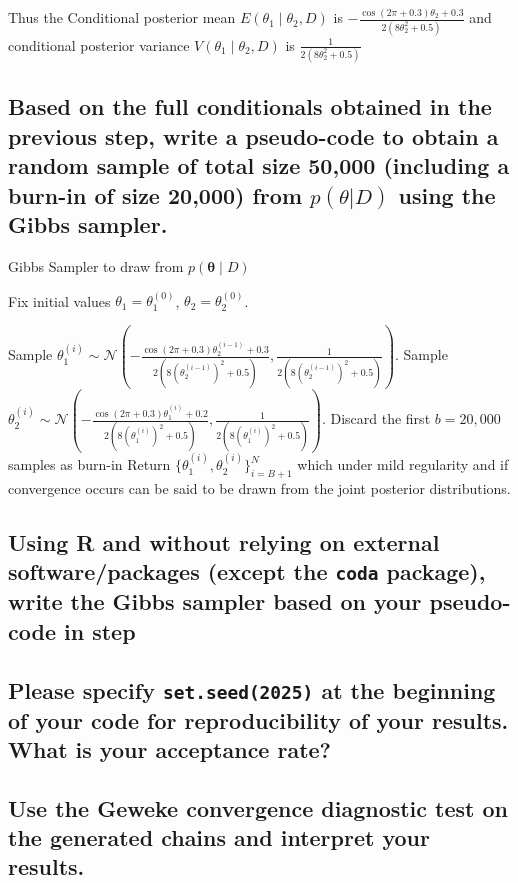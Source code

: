 \documentclass[12pt]{article}
\begin{document}
Thus the  Conditional posterior mean \(E(\theta_1 \mid \theta_2, D)\)  is $-\frac{\cos(2\pi + 0.3)\theta_2 + 0.3}{2(8\theta_2^2 + 0.5)}$ and  conditional posterior variance \(V(\theta_1 \mid \theta_2, D)\) is $\frac{1}{2(8\theta_2^2 + 0.5)}$

\subsection{ Based on the full conditionals obtained in the previous step, write a pseudo-code to obtain a random sample of total size 50,000 (including a burn-in of size 20,000) from $p(\theta | D)$ using the Gibbs sampler.} 
\begin{algorithm}
Gibbs Sampler to draw from \( p(\boldsymbol{\theta} \mid D) \)
\begin{algorithmic}[1]

\State Fix initial values \( \theta_1 = \theta_1^{(0)} \), \( \theta_2 = \theta_2^{(0)} \).

    \State Sample \( \theta_1^{(i)} \sim \mathcal{N}\left(-\frac{\cos(2\pi + 0.3)\theta_2^{(i-1)} + 0.3}{2(8(\theta_2^{(i-1)})^2 + 0.5)}, \frac{1}{2(8(\theta_2^{(i-1)})^2 + 0.5)}\right) \).
    \State Sample \( \theta_2^{(i)} \sim \mathcal{N}\left(-\frac{\cos(2\pi + 0.3)\theta_1^{(i)} + 0.2}{2(8(\theta_1^{(i)})^2 + 0.5)}, \frac{1}{2(8(\theta_1^{(i)})^2 + 0.5)}\right) \).
\EndFor
\State Discard the first \( b = 20,000 \) samples as burn-in
\State Return \( \{\theta_1^{(i)}, \theta_2^{(i)}\}_{i=B+1}^{N} \) which under mild regularity and if convergence occurs can be said to be drawn from the joint posterior distributions.
\end{algorithmic}
\end{algorithm}
\subsection{Using R and without relying on external software/packages (except the \texttt{coda} package), write the Gibbs sampler based on your pseudo-code in step }

\subsection{Please specify \texttt{set.seed(2025)} at the beginning of your code for reproducibility of your results. What is your acceptance rate?}

\subsection{Use the Geweke convergence diagnostic test on the generated chains and interpret your results.}
\end{document}
